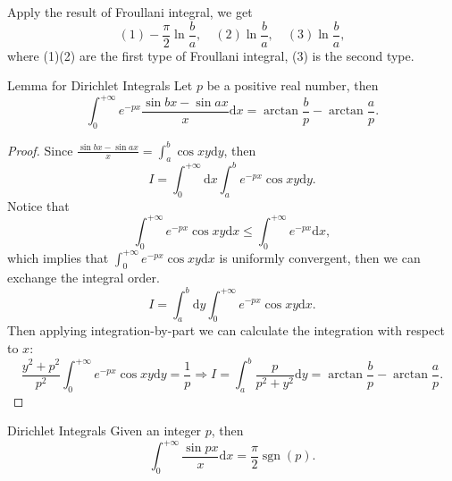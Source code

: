 \begin{solution}
  Apply the result of Froullani integral, we get 
  \begin{equation}
    (1) - \frac{\pi}{2} \ln \frac{b}{a}, \quad
    (2) \ln \frac{b}{a}, \quad
    (3) \ln \frac{b}{a},
  \end{equation}
  where (1)(2) are the first type of Froullani integral,
  (3) is the second type.
\end{solution}

\begin{lemma}{Lemma for Dirichlet Integrals}{}
  Let $p$ be a positive real number, then 
  \begin{equation}
    \int_0^{+\infty} e^{-px} \frac{\sin bx - \sin ax}{x}\mathrm{d}x
    = \arctan \frac{b}{p} - \arctan \frac{a}{p}.
  \end{equation}
\end{lemma}

\begin{proof}
  Since $\frac{\sin bx - \sin ax}{x} = \int_a^b \cos xy \mathrm{d} y$, then
  \begin{equation}
    I = \int_0^{+\infty} \mathrm{d} x \int_a^b e^{-px}\cos xy \mathrm{d} y.
  \end{equation}
  Notice that
  \begin{equation}
    \int_0^{+\infty} e^{-px} \cos xy\mathrm{d} x
    \leq \int_0^{+\infty}e^{-px}\mathrm{d} x,
  \end{equation}
  which implies that $\int_0^{+\infty}e^{-px}\cos xy \mathrm{d} x$ is uniformly
  convergent, then we can exchange the integral order.
  \begin{equation}
    I = \int_a^b \mathrm{d} y \int_0^{+\infty} e^{-px} \cos xy \mathrm{d} x.
  \end{equation}
  Then applying integration-by-part we can calculate the integration with
  respect to $x$:
  \begin{equation}
    \frac{y^2 + p^2}{p^2}\int_0^{+\infty} e^{-px} \cos xy \mathrm{d} y = \frac{1}{p}
    \Rightarrow I = \int_a^b \frac{p}{p^2 + y^2}\mathrm{d} y
    = \arctan \frac{b}{p} - \arctan \frac{a}{p}.
  \end{equation}
\end{proof}

\begin{theorem}{Dirichlet Integrals}{}
  Given an integer $p$, then
  \begin{equation}
    \int_0^{+\infty} \frac{\sin px}{x} \mathrm{d} x= \frac{\pi}{2} \operatorname{sgn}(p).
  \end{equation}
\end{theorem}

